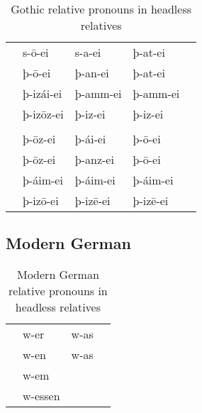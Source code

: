 \begin{table}[h]\label{tbl:paradigmgothic}
	\center
	\caption {Gothic relative pronouns in headless relatives}
	\begin{minipage}{0.7\linewidth}
		\begin{tabularx}{\textwidth}{c *{4}{Y}}
		\toprule
			&    &    &   \\
		\midrule
     & s-ō-ei 	  & s-a-ei 		& þ-at-ei	 \\
     & þ-ō-ei    & þ-an-ei  	& þ-at-ei  \\
     & þ-izái-ei & þ-amm-ei	& þ-amm-ei \\
     & þ-izōz-ei & þ-iz-ei		& þ-iz-ei  \\
		\bottomrule
    \toprule
    	&  	& 		& 		\\
    \midrule
     &	þ-ōz-ei		&	þ-ái-ei		& þ-ō-ei   	\\
     &	þ-ōz-ei		&	þ-anz-ei	& þ-ō-ei   	\\
     &	þ-áim-ei	&	þ-áim-ei 	& þ-áim-ei	\\
     &	þ-izō-ei	&	þ-izē-ei	& þ-izē-ei 	\\
    \bottomrule
		\end{tabularx}
	\end{minipage}
\end{table}


\subsection{Modern German}

\begin{table}[h]\label{tbl:paradigmg}
	\center
	\caption {Modern German relative pronouns in headless relatives}
	\begin{minipage}{0.4\linewidth}
		\begin{tabularx}{\textwidth}{c *{3}{Y}}
		\toprule
			&  &   \\
		\midrule
      & w-er   	& w-as     \\
      & w-en   	& w-as     \\
      & w-em   	&  		     \\
      & w-essen	& 		     \\
		\bottomrule
		\end{tabularx}
	\end{minipage}
\end{table}

